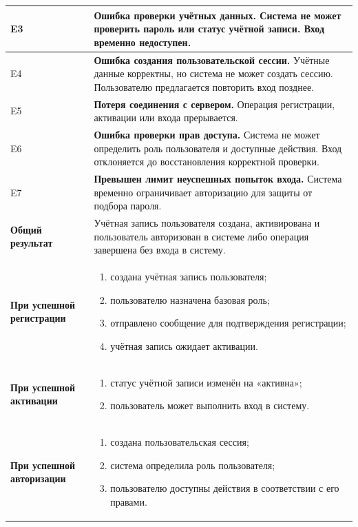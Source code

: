 \documentclass[12pt,a4paper]{article}
\begin{document}
\begin{xltabular}{\textwidth}{
			|>{\raggedright\arraybackslash}p{2.7cm}
			|>{\raggedright\arraybackslash}X|
		}
		E3 &
		\textbf{Ошибка проверки учётных данных.}
		Система не может проверить пароль или статус учётной записи.
		Вход временно недоступен. \\
		\hline
		
		E4 &
		\textbf{Ошибка создания пользовательской сессии.}
		Учётные данные корректны, но система не может создать сессию.
		Пользователю предлагается повторить вход позднее. \\
		\hline
		
		E5 &
		\textbf{Потеря соединения с сервером.}
		Операция регистрации, активации или входа прерывается. \\
		\hline
		
		E6 &
		\textbf{Ошибка проверки прав доступа.}
		Система не может определить роль пользователя и доступные действия.
		Вход отклоняется до восстановления корректной проверки. \\
		\hline
		
		E7 &
		\textbf{Превышен лимит неуспешных попыток входа.}
		Система временно ограничивает авторизацию для защиты от подбора пароля. \\
		\hline
		
		
		\textbf{Общий результат} &
		Учётная запись пользователя создана, активирована и пользователь
		авторизован в системе либо операция завершена без входа в систему. \\
		\hline
		
		\textbf{При успешной регистрации} &
		\begin{enumerate}
			\item создана учётная запись пользователя;
			\item пользователю назначена базовая роль;
			\item отправлено сообщение для подтверждения регистрации;
			\item учётная запись ожидает активации.
		\end{enumerate} \\
		\hline
		
		\textbf{При успешной активации} &
		\begin{enumerate}
			\item статус учётной записи изменён на «активна»;
			\item пользователь может выполнить вход в систему.
		\end{enumerate} \\
		\hline
		
		\textbf{При успешной авторизации} &
		\begin{enumerate}
			\item создана пользовательская сессия;
			\item система определила роль пользователя;
			\item пользователю доступны действия в соответствии с его правами.
		\end{enumerate} \\
		\hline
		

\end{xltabular}
\end{document}
